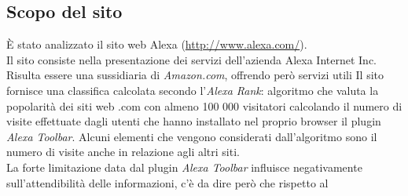 \subsection{Scopo del sito}
È stato analizzato il sito web Alexa (\url{http://www.alexa.com/}). \\
Il sito consiste nella presentazione dei servizi dell'azienda Alexa Internet Inc.
Risulta essere una sussidiaria di \textit{Amazon.com}, offrendo però servizi utili 
Il sito fornisce una classifica calcolata secondo l'\textit{Alexa Rank}: 
algoritmo che valuta la popolarità dei siti web .com con almeno 100 000 visitatori
 calcolando il numero di visite effettuate dagli utenti che hanno installato nel proprio browser il plugin \textit{Alexa Toolbar}. Alcuni elementi che vengono considerati
 dall'algoritmo sono il numero di visite anche in relazione agli altri siti. \\
La forte limitazione data dal plugin \textit{Alexa Toolbar} influisce negativamente
sull'attendibilità delle informazioni, c'è da dire però che rispetto al